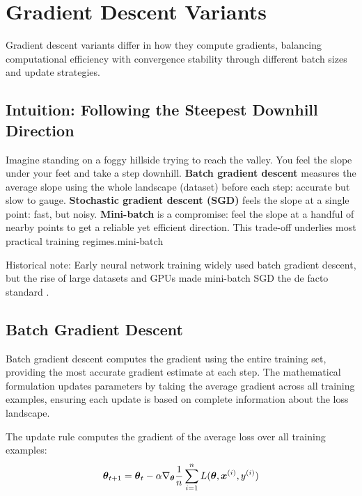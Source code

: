 
\section{Gradient Descent Variants }
\label{sec:gd-variants}

Gradient descent variants differ in how they compute gradients, balancing computational efficiency with convergence stability through different batch sizes and update strategies.

\subsection{Intuition: Following the Steepest Downhill Direction}

Imagine standing on a foggy hillside trying to reach the valley. You feel the slope under your feet and take a step downhill. \textbf{Batch gradient descent} measures the average slope using the whole landscape (dataset) before each step: accurate but slow to gauge. \textbf{Stochastic gradient descent (SGD)} feels the slope at a single point: fast, but noisy. \textbf{Mini-batch} is a compromise: feel the slope at a handful of nearby points to get a reliable yet efficient direction. This trade-off underlies most practical training regimes.\gls{mini-batch}

Historical note: Early neural network training widely used batch gradient descent, but the rise of large datasets and GPUs made mini-batch SGD the de facto standard \cite{GoodfellowEtAl2016,Prince2023}.

\subsection{Batch Gradient Descent}

Batch gradient descent computes the gradient using the entire training set, providing the most accurate gradient estimate at each step. The mathematical formulation updates parameters by taking the average gradient across all training examples, ensuring each update is based on complete information about the loss landscape.

The update rule computes the gradient of the average loss over all training examples:
\begin{equation}
\boldsymbol{\theta}_{t+1} = \boldsymbol{\theta}_t - \alpha \nabla_{\boldsymbol{\theta}} \frac{1}{n} \sum_{i=1}^{n} L(\boldsymbol{\theta}, \boldsymbol{x}^{(i)}, y^{(i)})
\end{equation}

